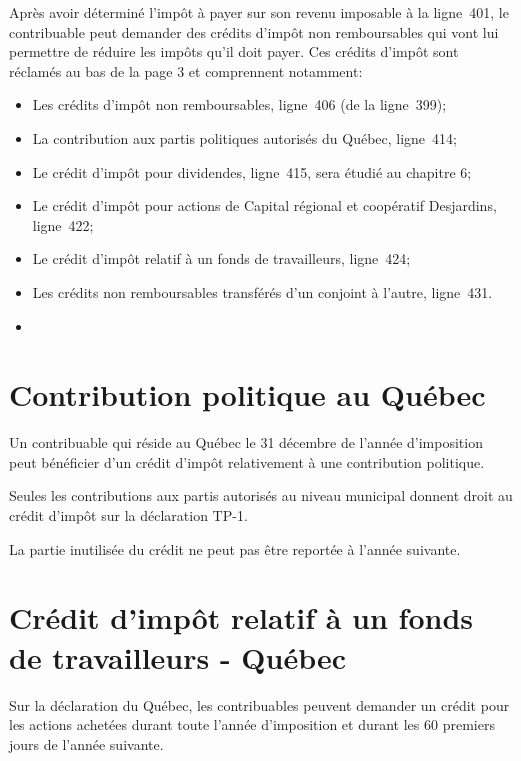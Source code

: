 Après avoir déterminé l'impôt à payer sur son revenu imposable à la ligne~401, le contribuable peut demander des crédits d'impôt non remboursables qui vont lui permettre de réduire les impôts qu'il doit payer. Ces crédits d'impôt sont réclamés au bas de la page 3 et comprennent notamment:
\begin{itemize}
	\item Les crédits d'impôt non remboursables, ligne~406 (de la ligne~399);
	\item La contribution aux partis politiques autorisés du Québec, ligne~414;
	\item Le crédit d'impôt pour dividendes, ligne~415, sera étudié au chapitre 6;
	\item Le crédit d'impôt pour actions de Capital régional et coopératif Desjardins, ligne~422;
	\item Le crédit d'impôt relatif à un fonds de travailleurs, ligne~424;
	\item Les crédits non remboursables transférés d'un conjoint à l'autre, ligne~431.
	\item 
\end{itemize}



\section{Contribution politique au Québec}
\begin{intro}
	Un contribuable qui réside au Québec le 31 décembre de l'année d'imposition peut bénéficier d'un crédit d'impôt relativement à une contribution politique.
\end{intro}
Seules les contributions aux partis autorisés au niveau municipal donnent droit au crédit d'impôt sur la déclaration TP-1.

\begin{note}
	La partie inutilisée du crédit ne peut pas être reportée à l'année suivante.
\end{note}



\section{Crédit d'impôt relatif à un fonds de travailleurs - Québec}
Sur la déclaration du Québec, les contribuables peuvent demander un crédit pour les actions achetées durant toute l'année d'imposition et durant les 60 premiers jours de l'année suivante.


